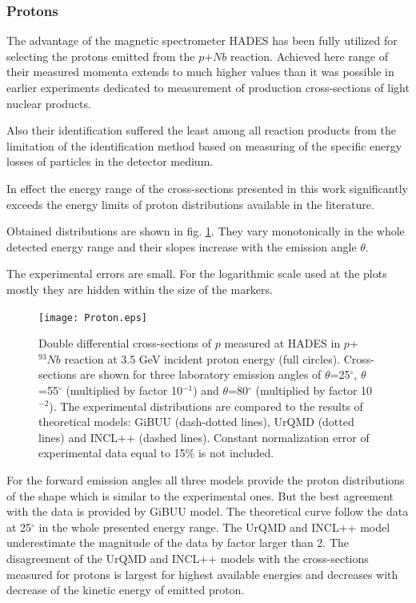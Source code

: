 \subsubsection{\label{prot} Protons}

The advantage of the magnetic spectrometer HADES has been fully utilized for selecting the protons emitted from the $p$+$Nb$ reaction. Achieved here range of their measured momenta extends to much higher values than it was possible in earlier experiments dedicated to measurement of production cross-sections of light nuclear products.   

Also their identification suffered the least among all reaction products from the limitation of the identification method based on measuring of the specific energy losses of particles in the detector medium.

In effect the energy range of the cross-sections presented in this work significantly exceeds the energy limits of proton distributions available in the literature.

Obtained distributions are shown in fig. \ref{p_m_3a}. They vary monotonically in the whole detected energy range and their slopes
increase with the emission angle $\theta$. 

The experimental errors are small.
For the logarithmic scale used at the plots mostly they are hidden within the size of the markers.

\begin{figure}[!hbt]
	\centering
	\texttt{[image: Proton.eps]}%
	\caption{\label{p_m_3a} Double differential cross-sections of $p$
		measured at HADES in $p$+$^{93}Nb$ reaction at 3.5 GeV incident proton
		energy (full circles). Cross-sections are shown for three laboratory
		emission angles of $\theta$=25$^{\circ}$, $\theta$=55$^{\circ}$
		(multiplied by factor 10$^{-1}$) and $\theta$=80$^{\circ}$
		(multiplied by factor 10$^{-2}$). The experimental distributions are
		compared to the results of theoretical models: GiBUU (dash-dotted
		lines), UrQMD (dotted lines) and INCL++ (dashed lines). Constant
		normalization error of experimental data equal to 15\% is not
		included. }
\end{figure}

For the forward emission angles all three models 
provide the proton distributions of the shape which is similar to the experimental ones. But 
the best agreement with the data is provided by GiBUU model. The theoretical curve follow the data at 25$^{\circ}$ in the whole presented energy range. The UrQMD and INCL++ model
underestimate the magnitude of the data by factor larger than 2.
The disagreement of the UrQMD and INCL++ models with the cross-sections measured for protons 
is largest for highest available energies and
decreases with decrease of the kinetic energy of emitted proton. 


